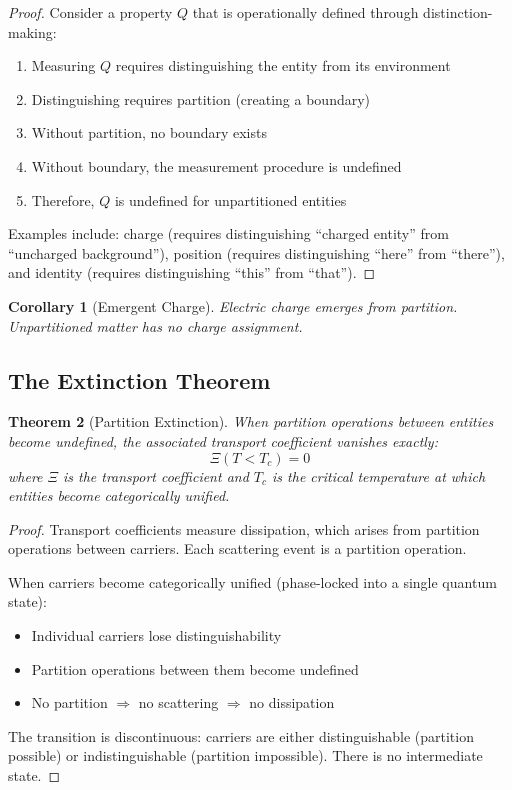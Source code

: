\documentclass[twocolumn,10pt,a4paper]{article}
\newtheorem{theorem}{Theorem}[section]
\newtheorem{corollary}[theorem]{Corollary}
\theoremstyle{definition}
\theoremstyle{remark}
\begin{document}
\begin{proof}
Consider a property $Q$ that is operationally defined through distinction-making:
\begin{enumerate}
    \item Measuring $Q$ requires distinguishing the entity from its environment
    \item Distinguishing requires partition (creating a boundary)
    \item Without partition, no boundary exists
    \item Without boundary, the measurement procedure is undefined
    \item Therefore, $Q$ is undefined for unpartitioned entities
\end{enumerate}

Examples include: charge (requires distinguishing ``charged entity'' from ``uncharged background''), position (requires distinguishing ``here'' from ``there''), and identity (requires distinguishing ``this'' from ``that'').
\end{proof}

\begin{corollary}[Emergent Charge]
\label{cor:charge}
Electric charge emerges from partition. Unpartitioned matter has no charge assignment.
\end{corollary}

\subsection{The Extinction Theorem}

\begin{theorem}[Partition Extinction]
\label{thm:extinction}
When partition operations between entities become undefined, the associated transport coefficient vanishes exactly:
\begin{equation}
    \Xi(T < T_c) = 0
\end{equation}
where $\Xi$ is the transport coefficient and $T_c$ is the critical temperature at which entities become categorically unified.
\end{theorem}

\begin{proof}
Transport coefficients measure dissipation, which arises from partition operations between carriers. Each scattering event is a partition operation.

When carriers become categorically unified (phase-locked into a single quantum state):
\begin{itemize}
    \item Individual carriers lose distinguishability
    \item Partition operations between them become undefined
    \item No partition $\Rightarrow$ no scattering $\Rightarrow$ no dissipation
\end{itemize}

The transition is discontinuous: carriers are either distinguishable (partition possible) or indistinguishable (partition impossible). There is no intermediate state.
\end{proof}
\end{document}
